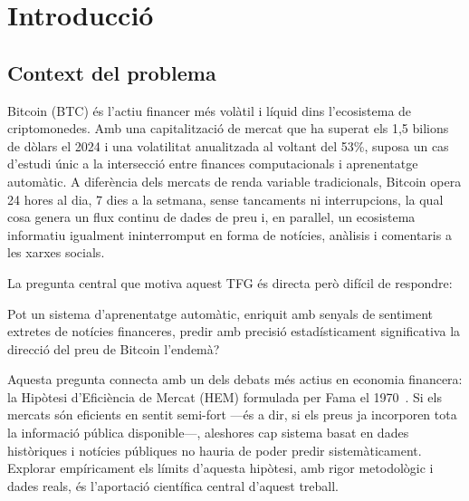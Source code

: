 \documentclass[12pt, a4paper]{report}
\begin{document}
\clearpage

\tableofcontents
\clearpage

\chapter{Introducció}

\section{Context del problema}

Bitcoin (BTC) és l'actiu financer més volàtil i líquid dins l'ecosistema de criptomonedes. Amb una capitalització de mercat que ha superat els 1,5 bilions de dòlars el 2024 i una volatilitat anualitzada al voltant del 53\%, suposa un cas d'estudi únic a la intersecció entre finances computacionals i aprenentatge automàtic. A diferència dels mercats de renda variable tradicionals, Bitcoin opera 24 hores al dia, 7 dies a la setmana, sense tancaments ni interrupcions, la qual cosa genera un flux continu de dades de preu i, en paral\textperiodcentered{}lel, un ecosistema informatiu igualment ininterromput en forma de notícies, anàlisis i comentaris a les xarxes socials.

La pregunta central que motiva aquest TFG és directa però difícil de respondre:

\begin{infobox}
Pot un sistema d'aprenentatge automàtic, enriquit amb senyals de sentiment extretes de notícies financeres, predir amb precisió estadísticament significativa la direcció del preu de Bitcoin l'endemà?
\end{infobox}

Aquesta pregunta connecta amb un dels debats més actius en economia financera: la Hipòtesi d'Eficiència de Mercat (HEM) formulada per Fama el 1970~\cite{fama1970}. Si els mercats són eficients en sentit semi-fort ---és a dir, si els preus ja incorporen tota la informació pública disponible---, aleshores cap sistema basat en dades històriques i notícies públiques no hauria de poder predir sistemàticament. Explorar empíricament els límits d'aquesta hipòtesi, amb rigor metodològic i dades reals, és l'aportació científica central d'aquest treball.
\end{document}
